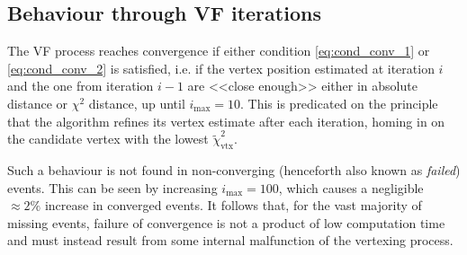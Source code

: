 \subsection{Behaviour through VF iterations}
\label{sec:oscillation}
The VF process reaches convergence if either condition \eqref{eq:cond_conv_1} or \eqref{eq:cond_conv_2} is satisfied, i.e. if the vertex position estimated at iteration $i$ and the one from iteration $i-1$ are <<close enough>> either in absolute distance or $\chi^2$ distance, up until $i_\text{max} = 10$.
This is predicated on the principle that the algorithm refines its vertex estimate after each iteration, homing in on the candidate vertex with the lowest $\tilde{\chi}^2_\text{vtx}$.

Such a behaviour is not found in non-converging (henceforth also known as \textit{failed}) events.
This can be seen by increasing $i_\text{max}=100$, which causes a negligible $\approx 2\%$ increase in converged events.
It follows that, for the vast majority of missing events, failure of convergence is not a product of low computation time and must instead result from some internal malfunction of the vertexing process.

